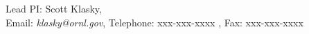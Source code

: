 \begin{center}
Lead PI: Scott Klasky, \ORNL\\
Email: \emph{klasky@ornl.gov}, Telephone: xxx-xxx-xxxx , Fax: xxx-xxx-xxxx
\end{center}
